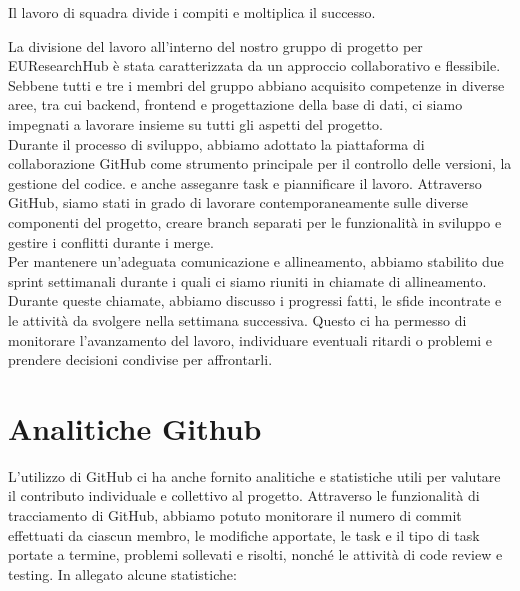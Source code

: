\documentclass{report}
\begin{document}
\begin{imtaQuote}
 Il lavoro di squadra divide i compiti e moltiplica il successo.
  \end{imtaQuote}
La divisione del lavoro all'interno del nostro gruppo di progetto per EUResearchHub è stata caratterizzata da un approccio collaborativo e flessibile. Sebbene tutti e tre i membri del gruppo abbiano acquisito competenze in diverse aree, tra cui backend, frontend e progettazione della base di dati, ci siamo impegnati a lavorare insieme su tutti gli aspetti del progetto.\\
Durante il processo di sviluppo, abbiamo adottato la piattaforma di collaborazione GitHub come strumento principale per il controllo delle versioni, la gestione del codice. e anche asseganre task e piannificare il lavoro. Attraverso GitHub, siamo stati in grado di lavorare contemporaneamente sulle diverse componenti del progetto, creare branch separati per le funzionalità in sviluppo e gestire i conflitti durante i merge.\\
Per mantenere un'adeguata comunicazione e allineamento, abbiamo stabilito due sprint settimanali durante i quali ci siamo riuniti in chiamate di allineamento. Durante queste chiamate, abbiamo discusso i progressi fatti, le sfide incontrate e le attività da svolgere nella settimana successiva. Questo ci ha permesso di monitorare l'avanzamento del lavoro, individuare eventuali ritardi o problemi e prendere decisioni condivise per affrontarli.


\section{Analitiche Github}
L'utilizzo di GitHub ci ha anche fornito analitiche e statistiche utili per valutare il contributo individuale e collettivo al progetto. Attraverso le funzionalità di tracciamento di GitHub, abbiamo potuto monitorare il numero di commit effettuati da ciascun membro, le modifiche apportate,  le task e il tipo di task portate a termine, problemi sollevati e risolti, nonché le attività di code review e testing.
In allegato alcune statistiche:
\end{document}
